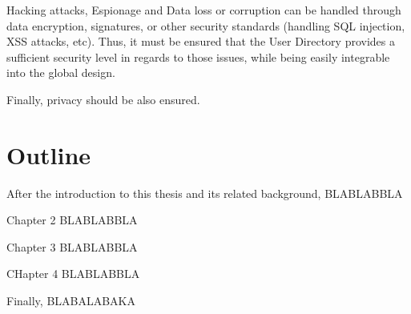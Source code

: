 Hacking attacks, Espionage and Data loss or corruption can be handled through data encryption, signatures, or other security standards (handling SQL injection, XSS attacks, etc). Thus, it must be ensured that the User Directory provides a sufficient security level in regards to those issues, while being easily integrable into the global design. 

Finally, privacy should be also ensured.
\\

\section{Outline}
After the introduction to this thesis and its related background, BLABLABBLA

Chapter 2 BLABLABBLA

Chapter 3 BLABLABBLA

CHapter 4 BLABLABBLA

Finally, BLABALABAKA



